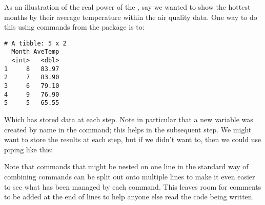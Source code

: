  
As an illustration of the real power of the , say we wanted to show the hottest months by their average temperature within the air quality data. One way to do this using commands from the  package is to: 
\begin{knitrout}
\color{fgcolor}\begin{kframe}
\begin{alltt}
\hlstd{> } \hlkwb{=} 
\hlstd{> } \hlkwb{=}  \hlstd{=}  \hlstd{=} \hlstd{))}
\hlstd{> } 
\end{alltt}
\begin{verbatim}
# A tibble: 5 x 2
  Month AveTemp
  <int>   <dbl>
1     8   83.97
2     7   83.90
3     6   79.10
4     9   76.90
5     5   65.55
\end{verbatim}
\end{kframe}
\end{knitrout}
Which has stored data at each step. Note in particular that a new variable was created by name in the  command; this helps in the subsequent  step. We might want to store the results at each step, but if we didn't want to, then we could use piping like this: 
\begin{knitrout}
\color{fgcolor}
\end{knitrout}
 
Note that commands that might be nested on one line in the standard way of combining commands can be split out onto multiple lines to make it even easier to see what has been managed by each command. This leaves room for comments to be added at the end of lines to help anyone else read the code being written. 
 
